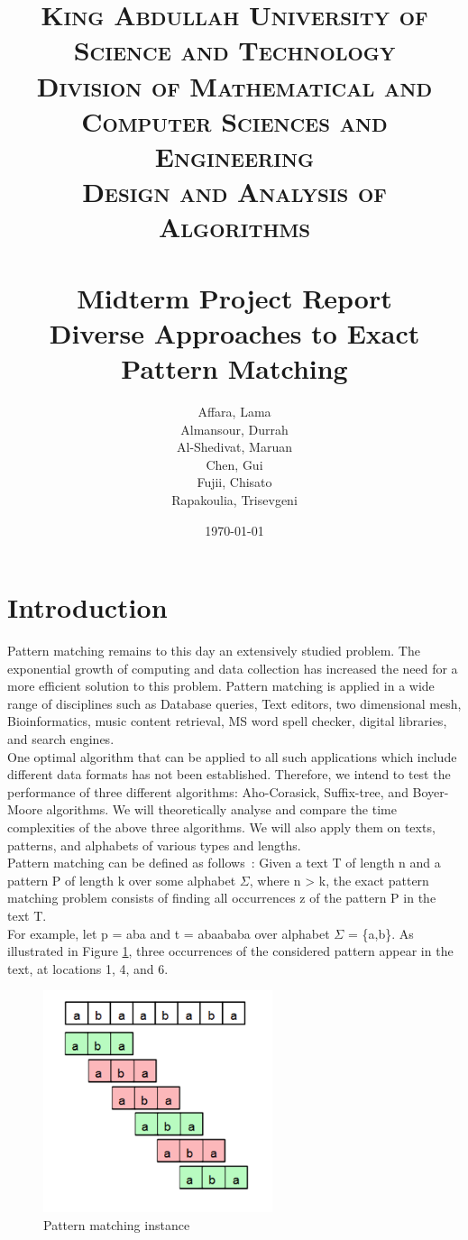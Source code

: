 \documentclass[paper=a4, fontsize=11pt]{scrartcl} %
\title{
\normalfont \normalsize
\textsc{King Abdullah University of Science and Technology\\
        Division of Mathematical and Computer Sciences and Engineering\\
        Design and Analysis of Algorithms} \\ [25pt] %
\horrule{0.5pt} \\[0.4cm] %
\Large Midterm Project Report\\
\huge Diverse Approaches to Exact Pattern Matching
\horrule{2pt} \\[0.5cm] %
}
\author{Affara, Lama\\
        Almansour, Durrah\\
        Al-Shedivat, Maruan\\
        Chen, Gui\\
        Fujii, Chisato\\
        Rapakoulia, Trisevgeni}
\date{\normalsize\today} %
\numberwithin{equation}{section} %
\numberwithin{figure}{section} %
\numberwithin{table}{section} %
\begin{document}
\begin{titlepage}
\maketitle
\thispagestyle{empty}
\clearpage
\end{titlepage}

\section{Introduction}
Pattern matching remains to this day an extensively studied problem. The exponential growth of computing and data collection has increased the need for a more efficient solution to this problem. Pattern matching is applied in a wide range of disciplines such as Database queries, Text editors, two dimensional mesh, Bioinformatics, music content retrieval, MS word spell checker, digital libraries, and search engines.\\

One optimal algorithm that can be applied to all such applications which include different data formats has not been established. Therefore, we intend to test the performance of three different algorithms: Aho-Corasick, Suffix-tree, and Boyer-Moore algorithms. We will theoretically analyse and compare the time complexities of the above three algorithms. We will also apply them on texts, patterns, and alphabets of various types and lengths.\\

Pattern matching can be defined as follows~\cite{intro}: Given a text T of length n and a pattern P of length k over some alphabet $\Sigma$, where n > k, the exact pattern matching problem consists of finding all occurrences z of the pattern P in the text T.\\

For example, let p = aba and t = abaababa over alphabet $\Sigma$ = \{a,b\}. As illustrated in Figure \ref{matching}, three occurrences of the considered pattern appear in the text, at locations 1, 4, and 6.

\begin{figure}[h!]
\centering
\includegraphics[width=0.6\textwidth]{figures/matching.png}
\caption{Pattern matching instance}
\label{matching}
\end{figure}
\end{document}
